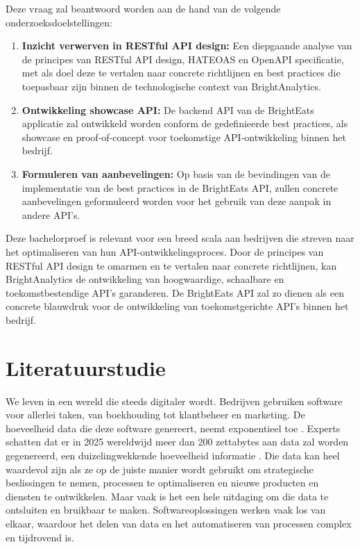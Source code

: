 \bigskip

Deze vraag zal beantwoord worden aan de hand van de volgende onderzoeksdoelstellingen:

\begin{enumerate}
\item \textbf{Inzicht verwerven in RESTful API design:} Een diepgaande analyse van de principes van RESTful API design, HATEOAS en OpenAPI specificatie, met als doel deze te vertalen naar concrete richtlijnen en best practices die toepasbaar zijn binnen de technologische context van BrightAnalytics.
\item \textbf{Ontwikkeling showcase API:} De backend API van de BrightEats applicatie zal ontwikkeld worden conform de gedefinieerde best practices, als showcase en proof-of-concept voor toekomstige API-ontwikkeling binnen het bedrijf.
\item \textbf{Formuleren van aanbevelingen:} Op basis van de bevindingen van de implementatie van de best practices in de BrightEats API, zullen concrete aanbevelingen geformuleerd worden voor het gebruik van deze aanpak in andere API's.
\end{enumerate}

\bigskip

Deze bachelorproef is relevant voor een breed scala aan bedrijven die streven naar het optimaliseren van hun API-ontwikkelingsproces. Door de principes van RESTful API design te omarmen en te vertalen naar concrete richtlijnen, kan BrightAnalytics de ontwikkeling van hoogwaardige, schaalbare en toekomstbestendige API's garanderen. De BrightEats API zal zo dienen als een concrete blauwdruk voor de ontwikkeling van toekomstgerichte API's binnen het bedrijf.

\section{Literatuurstudie}%
\label{sec:literatuurstudie}

We leven in een wereld die steeds digitaler wordt. Bedrijven gebruiken software voor allerlei taken, van boekhouding tot klantbeheer en marketing. De hoeveelheid data die deze software genereert, neemt exponentieel toe \autocite{Phiri2022}. Experts schatten dat er in 2025 wereldwijd meer dan 200 zettabytes aan data zal worden gegenereerd, een duizelingwekkende hoeveelheid informatie \autocite{Morgan2024}. Die data kan heel waardevol zijn als ze op de juiste manier wordt gebruikt om strategische beslissingen te nemen, processen te optimaliseren en nieuwe producten en diensten te ontwikkelen. Maar vaak is het een hele uitdaging om die data te ontsluiten en bruikbaar te maken. Softwareoplossingen werken vaak los van elkaar, waardoor het delen van data en het automatiseren van processen complex en tijdrovend is.

